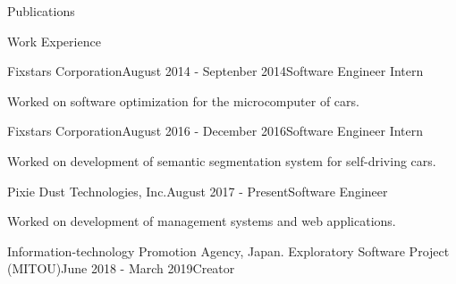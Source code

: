 \documentclass{resume} %
\begin{document}
\begin{rSection}{Publications}

\end{rSection}

\begin{rSection}{Work Experience}

    \begin{rSubsection}{Fixstars Corporation}{August 2014 - Septenber 2014}{Software Engineer Intern}{}
    \item Worked on software optimization for the microcomputer of cars.
    \end{rSubsection}

    \begin{rSubsection}{Fixstars Corporation}{August 2016 - December 2016}{Software Engineer Intern}{}
    \item Worked on development of semantic segmentation system for self-driving cars.
    \end{rSubsection}

    \begin{rSubsection}{Pixie Dust Technologies, Inc.}{August 2017 - Present}{Software Engineer}{}
    \item Worked on development of management systems and web applications.
    \end{rSubsection}

    \begin{rSubsection}{Information-technology Promotion Agency, Japan. Exploratory Software Project (MITOU)}{June 2018 - March 2019}{Creator}{}
    \item {}
    \end{rSubsection}

\end{rSection}
\end{document}
